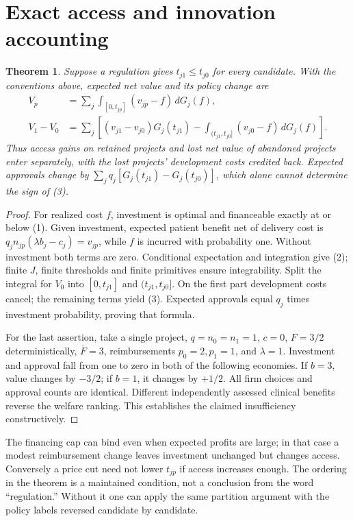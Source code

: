\documentclass[11pt]{article}
\newtheorem{theorem}{Theorem}
\begin{document}
\section{Exact access and innovation accounting}
\begin{theorem}\label{decomp}
Suppose a regulation gives $t_{j1}\leq t_{j0}$ for every candidate. With the
conventions above, expected net value and its policy change are
\begin{align}
 V_p&=\sum_j\int_{[0,t_{jp}]}(v_{jp}-f)\,dG_j(f),              \tag{2}\\
 V_1-V_0&=\sum_j\left[
 (v_{j1}-v_{j0})G_j(t_{j1})
 -\int_{(t_{j1},t_{j0}]}(v_{j0}-f)\,dG_j(f)\right].           \tag{3}
\end{align}
Thus access gains on retained projects and lost net value of abandoned
projects enter separately, with the lost projects' development costs
credited back. Expected approvals change by
$\sum_jq_j[G_j(t_{j1})-G_j(t_{j0})]$, which alone cannot determine the sign
of (3).
\end{theorem}
\begin{proof}
For realized cost $f$, investment is optimal and financeable exactly at or
below (1). Given investment, expected patient benefit net of delivery cost
is $q_jn_{jp}(\lambda b_j-c_j)=v_{jp}$, while $f$ is incurred with
probability one. Without investment both terms are zero. Conditional
expectation and integration give (2); finite $J$, finite thresholds and
finite primitives ensure integrability. Split the integral for $V_0$ into
$[0,t_{j1}]$ and $(t_{j1},t_{j0}]$. On the first part development costs
cancel; the remaining terms yield (3). Expected approvals equal $q_j$
times investment probability, proving that formula.

For the last assertion, take a single project, $q=n_0=n_1=1$, $c=0$,
$F=3/2$ deterministically, $\overline F=3$, reimbursements $p_0=2,p_1=1$,
and $\lambda=1$. Investment and approval fall from one to zero in both
of the following economies. If $b=3$, value changes by $-3/2$; if $b=1$,
it changes by $+1/2$. All firm choices and approval counts are identical.
Different independently assessed clinical benefits reverse the welfare
ranking. This establishes the claimed insufficiency constructively.
\end{proof}
The financing cap can bind even when expected profits are large; in that
case a modest reimbursement change leaves investment unchanged but changes
access. Conversely a price cut need not lower $t_{jp}$ if access increases
enough. The ordering in the theorem is a maintained condition, not a
conclusion from the word ``regulation.'' Without it one can apply the same
partition argument with the policy labels reversed candidate by candidate.
\end{document}
